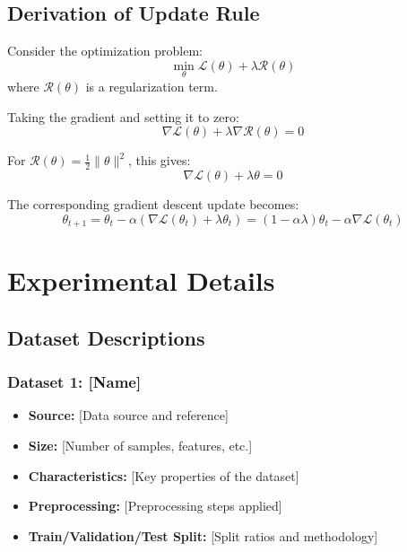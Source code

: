 \subsection{Derivation of Update Rule}
\label{app:update_derivation}

Consider the optimization problem:
\begin{equation}
\min_{\theta} \mathcal{L}(\theta) + \lambda \mathcal{R}(\theta)
\end{equation}
where $\mathcal{R}(\theta)$ is a regularization term.

Taking the gradient and setting it to zero:
\begin{equation}
\nabla \mathcal{L}(\theta) + \lambda \nabla \mathcal{R}(\theta) = 0
\end{equation}

For $\mathcal{R}(\theta) = \frac{1}{2}\|\theta\|^2$, this gives:
\begin{equation}
\nabla \mathcal{L}(\theta) + \lambda \theta = 0
\end{equation}

The corresponding gradient descent update becomes:
\begin{equation}
\theta_{t+1} = \theta_t - \alpha(\nabla \mathcal{L}(\theta_t) + \lambda \theta_t) = (1-\alpha\lambda)\theta_t - \alpha\nabla \mathcal{L}(\theta_t)
\end{equation}

\section{Experimental Details}
\label{app:experimental}

\subsection{Dataset Descriptions}
\label{app:datasets}

\subsubsection{Dataset 1: [Name]}
\begin{itemize}
    \item \textbf{Source:} [Data source and reference]
    \item \textbf{Size:} [Number of samples, features, etc.]
    \item \textbf{Characteristics:} [Key properties of the dataset]
    \item \textbf{Preprocessing:} [Preprocessing steps applied]
    \item \textbf{Train/Validation/Test Split:} [Split ratios and methodology]
\end{itemize}

